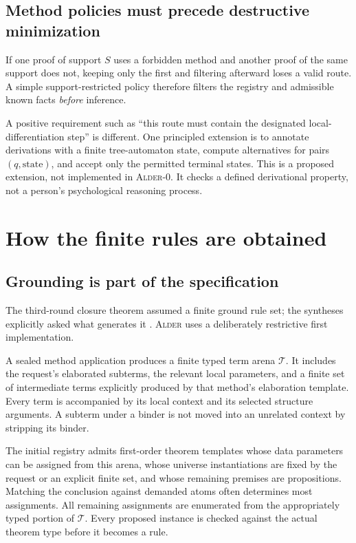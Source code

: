 \documentclass[11pt,a4paper]{article}
\newcommand{\Alder}{\textsc{Alder}}
\theoremstyle{plain}
\theoremstyle{definition}
\theoremstyle{remark}
\begin{document}
\subsection{Method policies must precede destructive minimization}
If one proof of support $S$ uses a forbidden method and another proof of the same support does not, keeping only the first and filtering afterward loses a valid route. A simple support-restricted policy therefore filters the registry and admissible known facts \emph{before} inference.

A positive requirement such as ``this route must contain the designated local-differentiation step'' is different. One principled extension is to annotate derivations with a finite tree-automaton state, compute alternatives for pairs $(q,\text{state})$, and accept only the permitted terminal states. This is a proposed extension, not implemented in \Alder{}-0. It checks a defined derivational property, not a person's psychological reasoning process.

\section{How the finite rules are obtained}\label{sec:grounding}

\subsection{Grounding is part of the specification}
The third-round closure theorem assumed a finite ground rule set; the syntheses explicitly asked what generates it \cite{r3a,r3b}. \Alder{} uses a deliberately restrictive first implementation.

A sealed method application produces a finite typed term arena $\mathcal T$. It includes the request's elaborated subterms, the relevant local parameters, and a finite set of intermediate terms explicitly produced by that method's elaboration template. Every term is accompanied by its local context and its selected structure arguments. A subterm under a binder is not moved into an unrelated context by stripping its binder.

The initial registry admits first-order theorem templates whose data parameters can be assigned from this arena, whose universe instantiations are fixed by the request or an explicit finite set, and whose remaining premises are propositions. Matching the conclusion against demanded atoms often determines most assignments. All remaining assignments are enumerated from the appropriately typed portion of $\mathcal T$. Every proposed instance is checked against the actual theorem type before it becomes a rule.
\end{document}
